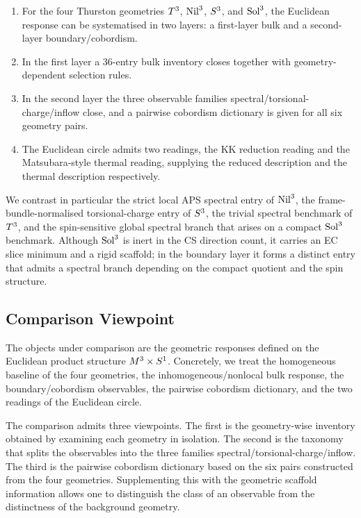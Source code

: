 \begin{enumerate}
  \item For the four Thurston geometries $T^3$, $\mathrm{Nil}^3$, $S^3$,
        and $\mathrm{Sol}^3$, the Euclidean response can be systematised in two
        layers: a first-layer bulk and a second-layer boundary/cobordism.
  \item In the first layer a 36-entry bulk inventory closes together with
        geometry-dependent selection rules.
  \item In the second layer the three observable families
        spectral/torsional-charge/inflow close, and a pairwise cobordism
        dictionary is given for all six geometry pairs.
  \item The Euclidean circle admits two readings, the KK reduction reading and
        the Matsubara-style thermal reading, supplying the reduced description
        and the thermal description respectively.
\end{enumerate}

We contrast in particular the strict local APS spectral entry of $\mathrm{Nil}^3$,
the frame-bundle-normalised torsional-charge entry of $S^3$, the trivial
spectral benchmark of $T^3$, and the spin-sensitive global spectral branch
that arises on a compact $\mathrm{Sol}^3$ benchmark.  Although $\mathrm{Sol}^3$ is inert
in the CS direction count, it carries an EC slice minimum and a rigid
scaffold; in the boundary layer it forms a distinct entry that admits a
spectral branch depending on the compact quotient and the spin structure.

\subsection{Comparison Viewpoint}
\label{sec:intro:viewpoint}

The objects under comparison are the geometric responses defined on the
Euclidean product structure $M^3\times S^1$.  Concretely, we treat the
homogeneous baseline of the four geometries, the inhomogeneous/nonlocal bulk
response, the boundary/cobordism observables, the pairwise cobordism
dictionary, and the two readings of the Euclidean circle.

The comparison admits three viewpoints.  The first is the geometry-wise
inventory obtained by examining each geometry in isolation.  The second is the
taxonomy that splits the observables into the three families
spectral/torsional-charge/inflow.  The third is the pairwise cobordism
dictionary based on the six pairs constructed from the four geometries.
Supplementing this with the geometric scaffold information allows one to
distinguish the class of an observable from the distinctness of the
background geometry.

